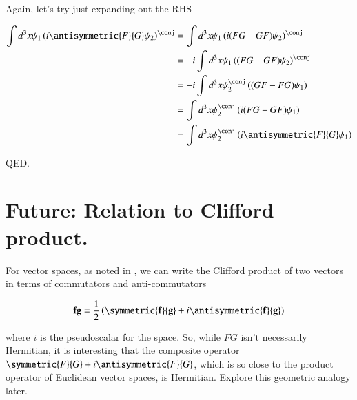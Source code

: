 Again, let's try just expanding out the RHS

\begin{align*}
\int d^3 x \psi_1 \left( i \antisymmetric{F}{G} \psi_2 \right)^\conj 
&= \int d^3 x \psi_1 \left(i(F G - G F) \psi_2 \right)^\conj \\
&= -i \int d^3 x \psi_1 \left((F G - G F) \psi_2 \right)^\conj \\
&= -i \int d^3 x \psi_2^\conj \left((G F - F G) \psi_1 \right) \\
&= \int d^3 x \psi_2^\conj \left(i (F G - G F) \psi_1 \right) \\
&= \int d^3 x \psi_2^\conj \left(i \antisymmetric{F}{G}\psi_1 \right) \\
\end{align*}

QED.

\section{Future: Relation to Clifford product. }

For vector spaces, as noted in \citep{PJpauliMatrix},
we can write the Clifford product of two  vectors in terms of commutators and anti-commutators

\begin{align*}
\Bf \Bg = \inv{2} \left( \symmetric{\Bf}{\Bg} + i \antisymmetric{\Bf}{\Bg} \right)
\end{align*}

where $i$ is the pseudoscalar for the space.  So, while $FG$ isn't necessarily Hermitian, it is interesting that the composite operator
$\symmetric{F}{G} + i \antisymmetric{F}{G}$, which is so close to the product operator of Euclidean vector spaces, is Hermitian.
Explore this geometric analogy later.

%
%

%
